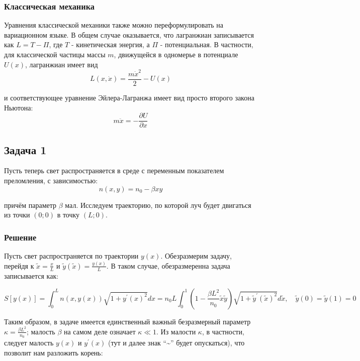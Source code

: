 \documentclass[a4paper,12pt]{article}
\begin{document}
\subsubsection*{Классическая механика}

Уравнения классической механики также можно переформулировать на вариационном
языке. В общем случае оказывается, что лагранжиан записывается как
$L=T-\Pi$, где $T$ - кинетическая энергия, а $\Pi$ - потенциальная.
В частности, для классической частицы массы $m$, движущейся в одномерье
в потенциале $U(x)$, лагранжиан имеет вид 
\[
L(x,\dot{x})=\frac{m\dot{x}^{2}}{2}-U(x)
\]

\noindent
и соответствующее уравнение Эйлера-Лагранжа имеет вид просто второго
закона Ньютона:
\[
m\ddot{x}=-\frac{\partial U}{\partial x}
\]



\subsection*{Задача 1}

Пусть теперь свет распространяется в среде с переменным показателем
преломления, с зависимостью:
\[
n\left(x,y\right)=n_{0}-\beta xy
\]

\noindent
причём параметр $\beta$ мал. Исследуем траекторию, по которой луч
будет двигаться из точки $(0;0)$ в точку $(L;0)$.


\subsubsection*{Решение}

Пусть свет распространяется по траектории $y(x)$. Обезразмерим задачу,
перейдя к $\widetilde{x}=\frac{x}{L}$ и $\widetilde{y}(\widetilde{x})=\frac{y(x)}{L}$.
В таком случае, обезразмеренна задача записывается как:

\[
S[y(x)]=\int_{0}^{L}n(x,y(x))\sqrt{1+y^{\prime}(x)^{2}}dx
=n_{0}L\int_{0}^{1}\left(1-\frac{\beta L^{2}}{n_{0}}\tilde{x}\tilde{y}\right)\sqrt{1+\tilde{y}^{\prime}\left(\tilde{x}\right)^{2}}d\tilde{x},\quad
\widetilde{y}(0)=\widetilde{y}(1)=0
\]

\noindent
Таким образом, в задаче имеется единственный важный безразмерный параметр
$\kappa=\frac{\beta L^{2}}{n_{0}}$; малость $\beta$ на самом деле
означает $\kappa\ll1$. Из малости $\kappa$, в частности, следует
малость $y(x)$ и $y^{\prime}(x)$ (тут и далее знак ``\textasciitilde{}''
будет опускаться), что позволит нам разложить корень:
\end{document}
